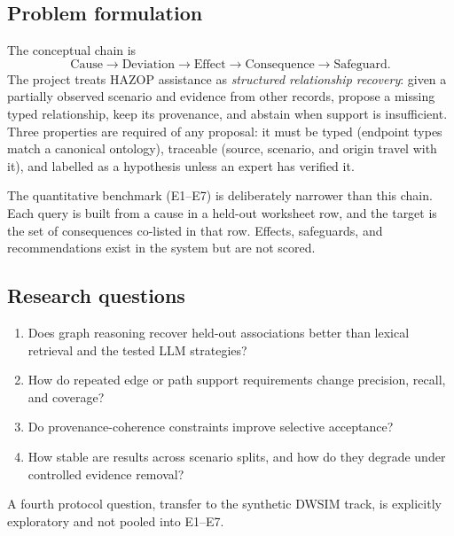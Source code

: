 \documentclass[10pt,twocolumn,a4paper]{extarticle}
\begin{document}
\subsection{Problem formulation}
The conceptual chain is
\begingroup\small
\[
\text{Cause}\to\text{Deviation}\to\text{Effect}\to\text{Consequence}\to\text{Safeguard}.
\]\endgroup
The project treats HAZOP assistance as \emph{structured relationship recovery}: given a partially observed scenario and evidence from other records, propose a missing typed relationship, keep its provenance, and abstain when support is insufficient. Three properties are required of any proposal: it must be typed (endpoint types match a canonical ontology), traceable (source, scenario, and origin travel with it), and labelled as a hypothesis unless an expert has verified it.

The quantitative benchmark (E1--E7) is deliberately narrower than this chain. Each query is built from a cause in a held-out worksheet row, and the target is the set of consequences co-listed in that row. Effects, safeguards, and recommendations exist in the system but are not scored.

\subsection{Research questions}
\begin{enumerate}[leftmargin=*,itemsep=1pt]
  \item[RQ1] Does graph reasoning recover held-out associations better than lexical retrieval and the tested LLM strategies?
  \item[RQ2] How do repeated edge or path support requirements change precision, recall, and coverage?
  \item[RQ3] Do provenance-coherence constraints improve selective acceptance?
  \item[RQ4] How stable are results across scenario splits, and how do they degrade under controlled evidence removal?
\end{enumerate}
A fourth protocol question, transfer to the synthetic DWSIM track, is explicitly exploratory and not pooled into E1--E7.
\end{document}
